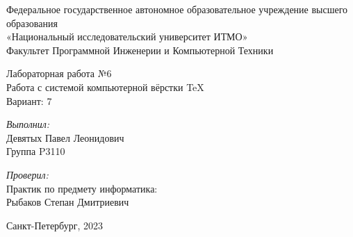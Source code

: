 \fancyhf{} 
\pagecolor[rgb]{1,1,1}
\begin{center}
\Large Федеральное государственное автономное образовательное учреждение высшего образования\\ «Национальный исследовательский университет ИТМО»\\
Факультет Программной Инженерии и Компьютерной Техники\\
\hfill 


\vspace{7cm}
\Large Лабораторная работа №6 \\
Работа с системой компьютерной вёрстки \TeX\\
Вариант: 7\\
\end{center}

\vspace{7.5cm}
 
\begin{flushright}
\textit{Выполнил:}\\
Девятых Павел Леонидович\\
Группа P3110\

\textit{Проверил:}\\
Практик по предмету информатика:\\
Рыбаков Степан Дмитриевич\\
\end{flushright}
 
\vfill

\begin{center} Санкт-Петербург, 2023 \end{center}